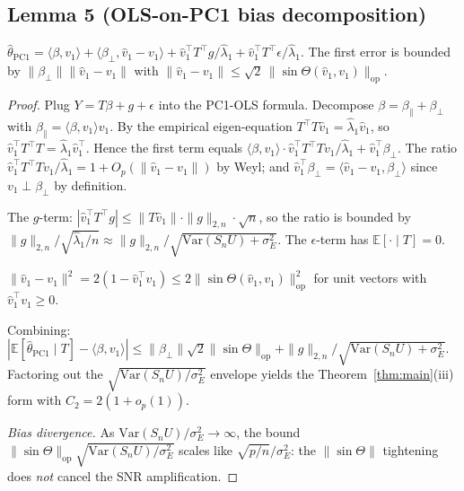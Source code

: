 \subsection*{Lemma 5 (OLS-on-PC1 bias decomposition)}

\begin{lemma}\label{lem:pc1-bias}
$\widehat\theta_{\mathrm{PC1}}=\langle\beta,v_1\rangle+\langle\beta_\perp,\widehat v_1-v_1\rangle
+\widehat v_1^\top T^\top g/\widehat\lambda_1+\widehat v_1^\top T^\top\epsilon/\widehat\lambda_1.$
The first error is bounded by $\|\beta_\perp\|\|\widehat v_1-v_1\|$ with
$\|\widehat v_1-v_1\|\le\sqrt 2\,\|\sin\Theta(\widehat v_1,v_1)\|_{\mathrm{op}}$.
\end{lemma}

\begin{proof}
Plug $Y=T\beta+g+\epsilon$ into the PC1-OLS formula. Decompose
$\beta=\beta_\parallel+\beta_\perp$ with $\beta_\parallel=\langle\beta,v_1\rangle v_1$.
By the empirical eigen-equation $T^\top T\widehat v_1=\widehat\lambda_1\widehat v_1$,
so $\widehat v_1^\top T^\top T=\widehat\lambda_1\widehat v_1^\top$. Hence the first
term equals $\langle\beta,v_1\rangle\cdot\widehat v_1^\top T^\top T v_1/\widehat\lambda_1
+\widehat v_1^\top\beta_\perp$.
The ratio $\widehat v_1^\top T^\top T v_1/\widehat\lambda_1=1+O_p(\|\widehat v_1-v_1\|)$
by Weyl; and $\widehat v_1^\top\beta_\perp=\langle\widehat v_1-v_1,\beta_\perp\rangle$
since $v_1\perp\beta_\perp$ by definition.

The $g$-term: $|\widehat v_1^\top T^\top g|\le\|T\widehat v_1\|\cdot\|g\|_{2,n}\cdot\sqrt n$,
so the ratio is bounded by $\|g\|_{2,n}/\sqrt{\widehat\lambda_1/n}\approx\|g\|_{2,n}/\sqrt{\mathrm{Var}(S_nU)+\sigma_E^2}$.
The $\epsilon$-term has $\mathbb E[\cdot\mid T]=0$.

$\|\widehat v_1-v_1\|^2=2(1-\widehat v_1^\top v_1)\le 2\|\sin\Theta(\widehat v_1,v_1)\|_{\mathrm{op}}^2$
for unit vectors with $\widehat v_1^\top v_1\ge 0$.

Combining: $|\mathbb E[\widehat\theta_{\mathrm{PC1}}\mid T]-\langle\beta,v_1\rangle|
\le\|\beta_\perp\|\sqrt 2\|\sin\Theta\|_{\mathrm{op}}+\|g\|_{2,n}/\sqrt{\mathrm{Var}(S_nU)+\sigma_E^2}$.
Factoring out the $\sqrt{\mathrm{Var}(S_nU)/\sigma_E^2}$ envelope yields the
Theorem~\ref{thm:main}(iii) form with $C_2=2(1+o_p(1))$.

\emph{Bias divergence.} As $\mathrm{Var}(S_nU)/\sigma_E^2\to\infty$, the bound
$\|\sin\Theta\|_{\mathrm{op}}\sqrt{\mathrm{Var}(S_nU)/\sigma_E^2}$ scales like
$\sqrt{p/n}/\sigma_E^2$: the $\|\sin\Theta\|$ tightening does \emph{not} cancel
the SNR amplification.
\end{proof}

